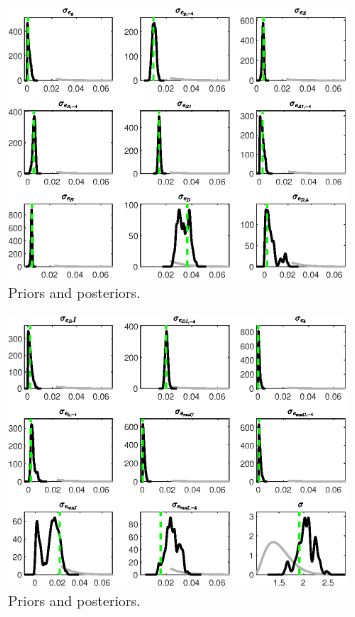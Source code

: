  
\begin{figure}[H]
\centering
\includegraphics[width=0.80\textwidth]{BRS_sectoral_wo_fixed_cost/Output/BRS_sectoral_wo_fixed_cost_PriorsAndPosteriors1}
\caption{Priors and posteriors.}\label{Fig:PriorsAndPosteriors:1}
\end{figure}
 
\begin{figure}[H]
\centering
\includegraphics[width=0.80\textwidth]{BRS_sectoral_wo_fixed_cost/Output/BRS_sectoral_wo_fixed_cost_PriorsAndPosteriors2}
\caption{Priors and posteriors.}\label{Fig:PriorsAndPosteriors:2}
\end{figure}
 
